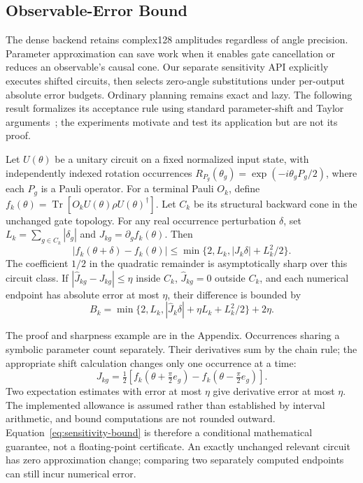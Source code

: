 \subsection{Observable-Error Bound}
\label{sec:sensitivity-theory}
The dense backend retains complex128 amplitudes regardless of angle precision. Parameter approximation can save work when it enables gate cancellation or reduces an observable's causal cone. Our separate sensitivity API explicitly executes shifted circuits, then selects zero-angle substitutions under per-output absolute error budgets. Ordinary planning remains exact and lazy. The following result formalizes its acceptance rule using standard parameter-shift and Taylor arguments~\cite{schuld2019gradients,lerch2026patches}; the experiments motivate and test its application but are not its proof.

\begin{theorem}
\label{thm:observable-error}
Let $U(\theta)$ be a unitary circuit on a fixed normalized input state, with independently indexed rotation occurrences $R_{P_g}(\theta_g)=\exp(-i\theta_gP_g/2)$, where each $P_g$ is a Pauli operator. For a terminal Pauli $O_k$, define $f_k(\theta)=\operatorname{Tr}[O_kU(\theta)\rho U(\theta)^\dagger]$. Let $C_k$ be its structural backward cone in the unchanged gate topology. For any real occurrence perturbation $\delta$, set $L_k=\sum_{g\in C_k}|\delta_g|$ and $J_{kg}=\partial_g f_k(\theta)$. Then
\begin{equation}
 |f_k(\theta+\delta)-f_k(\theta)|
 \leq\min\{2,L_k,|J_k\delta|+L_k^2/2\}.
 \label{eq:ideal-sensitivity-bound}
\end{equation}
The coefficient $1/2$ in the quadratic remainder is asymptotically sharp over this circuit class. If $|\widehat J_{kg}-J_{kg}|\leq\eta$ inside $C_k$, $\widehat J_{kg}=0$ outside $C_k$, and each numerical endpoint has absolute error at most $\eta$, their difference is bounded by
\begin{equation}
 B_k=\min\{2,L_k,|\widehat J_k\delta|+\eta L_k+L_k^2/2\}+2\eta.
 \label{eq:sensitivity-bound}
\end{equation}
\end{theorem}

The proof and sharpness example are in the Appendix. Occurrences sharing a symbolic parameter count separately. Their derivatives sum by the chain rule; the appropriate shift calculation changes only one occurrence at a time:
\begin{equation}
 J_{kg}=\tfrac12[f_k(\theta+\tfrac\pi2 e_g)-f_k(\theta-\tfrac\pi2 e_g)].
\end{equation}
Two expectation estimates with error at most $\eta$ give derivative error at most $\eta$. The implemented allowance is assumed rather than established by interval arithmetic, and bound computations are not rounded outward. Equation~\eqref{eq:sensitivity-bound} is therefore a conditional mathematical guarantee, not a floating-point certificate. An exactly unchanged relevant circuit has zero approximation change; comparing two separately computed endpoints can still incur numerical error.


